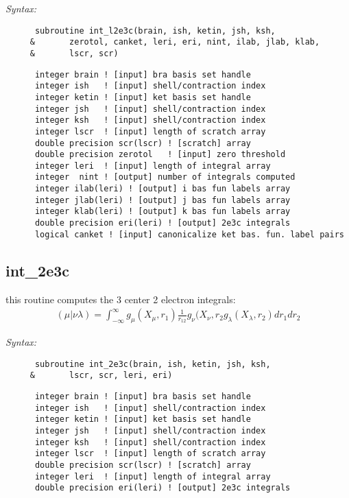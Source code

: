 {\it Syntax:} 
\begin{verbatim} 
      subroutine int_l2e3c(brain, ish, ketin, jsh, ksh, 
     &       zerotol, canket, leri, eri, nint, ilab, jlab, klab, 
     &       lscr, scr) 
\end{verbatim} 
\begin{verbatim} 
      integer brain ! [input] bra basis set handle 
      integer ish   ! [input] shell/contraction index 
      integer ketin ! [input] ket basis set handle 
      integer jsh   ! [input] shell/contraction index 
      integer ksh   ! [input] shell/contraction index 
      integer lscr  ! [input] length of scratch array 
      double precision scr(lscr) ! [scratch] array 
      double precision zerotol   ! [input] zero threshold 
      integer leri  ! [input] length of integral array 
      integer  nint ! [output] number of integrals computed 
      integer ilab(leri) ! [output] i bas fun labels array 
      integer jlab(leri) ! [output] j bas fun labels array 
      integer klab(leri) ! [output] k bas fun labels array 
      double precision eri(leri) ! [output] 2e3c integrals 
      logical canket ! [input] canonicalize ket bas. fun. label pairs 
\end{verbatim} 
\subsection{int\_2e3c} 
this routine computes the 3 center 2 electron integrals:  
\begin{eqnarray*} 
({\mu}|{\nu}{\lambda}) = \int_{-\infty}^{\infty} g_{\mu}(X_{\mu},r_{1})\frac{1}{r_{12}} 
g_{\nu}(X_{\nu},r_{2}g_{\lambda}(X_{\lambda},r_{2})dr_{1}dr_{2} 
\end{eqnarray*} 
 
{\it Syntax:} 
\begin{verbatim} 
      subroutine int_2e3c(brain, ish, ketin, jsh, ksh, 
     &       lscr, scr, leri, eri) 
\end{verbatim} 
\begin{verbatim} 
      integer brain ! [input] bra basis set handle 
      integer ish   ! [input] shell/contraction index 
      integer ketin ! [input] ket basis set handle 
      integer jsh   ! [input] shell/contraction index 
      integer ksh   ! [input] shell/contraction index 
      integer lscr  ! [input] length of scratch array 
      double precision scr(lscr) ! [scratch] array 
      integer leri  ! [input] length of integral array 
      double precision eri(leri) ! [output] 2e3c integrals 
\end{verbatim} 
